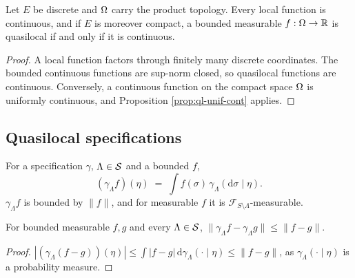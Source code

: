 \begin{proposition}
    \label{prop:ql-continuous-iff}
    \leanok

    Let $E$ be discrete and $\Omega$ carry the product topology. Every local function is
    continuous, and if $E$ is moreover compact, a bounded measurable $f : \Omega \to \mathbb{R}$ is
    quasilocal if and only if it is continuous.
\end{proposition}
\begin{proof}
    \leanok

    A local function factors through finitely many discrete coordinates. The bounded continuous
    functions are sup-norm closed, so quasilocal functions are continuous. Conversely, a
    continuous function on the compact space $\Omega$ is uniformly continuous, and
    Proposition \ref{prop:ql-unif-cont} applies.
\end{proof}

\subsection*{Quasilocal specifications}

\begin{definition}
    \label{def:ql-action}
    \leanok

    For a specification $\gamma$, $\Lambda \in \mathcal{S}$ and a bounded $f$,
    \[(\gamma_\Lambda f)(\eta) \;=\; \int f(\sigma)\, \gamma_\Lambda(\mathrm{d}\sigma \mid \eta).\]
    $\gamma_\Lambda f$ is bounded by $\|f\|$, and for measurable $f$ it is
    $\mathcal{F}_{S\setminus\Lambda}$-measurable.
\end{definition}

\begin{lemma}
    \label{lem:ql-action-contraction}
    \leanok

    For bounded measurable $f, g$ and every $\Lambda \in \mathcal{S}$,
    $\|\gamma_\Lambda f - \gamma_\Lambda g\| \le \|f - g\|$.
\end{lemma}
\begin{proof}
    \leanok

    $|(\gamma_\Lambda(f-g))(\eta)| \le \int |f - g| \,\mathrm{d}\gamma_\Lambda(\cdot\mid\eta)
    \le \|f-g\|$, as $\gamma_\Lambda(\cdot \mid \eta)$ is a probability measure.
\end{proof}

